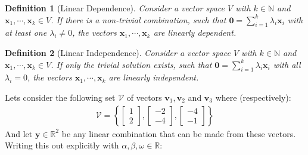 \documentclass[a4paper,12pt]{article}
\newcommand{\set}[1]{\mathcal{#1}}
\newcommand{\vectr}[1]{\textbf{#1}}
\newcommand{\real}{\mathbb{R}}
\newcommand{\natral}{\mathbb{N}}
\newcommand{\italic}[1]{\textit{#1}}
\newtheorem{definition}{Definition}[section]
\begin{document}
	\begin{definition}[Linear Dependence] 
		\normalfont Consider a vector space $\italic{V}$ with $k \in \natral$ and  $\vectr{x}_1,\cdots,\vectr{x}_k \in \italic{V}$. If there is a non-trivial combination, such that $\vectr{0} = \sum_{i=1}^{k} \lambda_i\vectr{x}_i$ with at least one $\lambda_i \ne 0$, the vectors  $\vectr{x}_1,\cdots,\vectr{x}_k$ are \italic{linearly dependent}. \label{def:linear_independence}
	\end{definition} 
	\begin{definition}[Linear Independence]
		\normalfont Consider a vector space $\italic{V}$ with $k \in \natral$ and  $\vectr{x}_1,\cdots,\vectr{x}_k \in \italic{V}$. If only the trivial solution exists, such that $\vectr{0} = \sum_{i=1}^{k} \lambda_i\vectr{x}_i$ with all $\lambda_i = 0$, the vectors $\vectr{x}_1,\cdots,\vectr{x}_k $ are \italic{linearly independent}.
		\label{def:linear_independence}
	\end{definition}
	Lets consider the following set $\set{V}$ of vectors $\vectr{v}_1,\vectr{v}_2 $ and $ \vectr{v}_3$ where (respectively):
	\begin{align}
		\set{V} = \left\{\begin{bmatrix} 1 \\ 2 \end{bmatrix},\begin{bmatrix} -2 \\ -4 \end{bmatrix},\begin{bmatrix} -4 \\ -1 \end{bmatrix} \right\}
	\end{align}
	And let $\vectr{y} \in \real^2$ be any linear combination that can be made from these vectors. Writing this out explicitly with $\alpha, \beta, \omega \in \real$:
\end{document}
